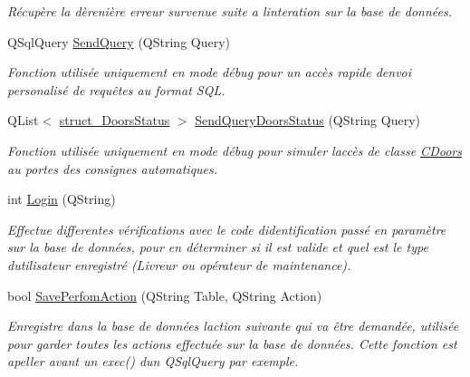 \begin{DoxyCompactItemize}
\begin{DoxyCompactList}\small\item\em Récupère la dèrenière erreur survenue suite a l\textquotesingle{}interation sur la base de données. \end{DoxyCompactList}\item 
Q\+Sql\+Query \hyperlink{class_c_s_q_lite___local___d_b_ace38eaa62cc5639b2a7be726d51a70f7}{Send\+Query} (Q\+String Query)
\begin{DoxyCompactList}\small\item\em Fonction utilisée uniquement en mode débug pour un accès rapide d\textquotesingle{}envoi personalisé de requêtes au format S\+Q\+L. \end{DoxyCompactList}\item 
Q\+List$<$ \hyperlink{structstruct___doors_status}{struct\+\_\+\+Doors\+Status} $>$ \hyperlink{class_c_s_q_lite___local___d_b_a0f79fbd185261af7806a3a99292ef0a3}{Send\+Query\+Doors\+Status} (Q\+String Query)
\begin{DoxyCompactList}\small\item\em Fonction utilisée uniquement en mode débug pour simuler l\textquotesingle{}accès de classe \hyperlink{class_c_doors}{C\+Doors} au portes des consignes automatiques. \end{DoxyCompactList}\item 
int \hyperlink{class_c_s_q_lite___local___d_b_a8114d5c22ae0a43e5466f3d69b3a9e84}{Login} (Q\+String)
\begin{DoxyCompactList}\small\item\em Effectue differentes vérifications avec le code d\textquotesingle{}identification passé en paramètre sur la base de données, pour en déterminer si il est valide et quel est le type d\textquotesingle{}utilisateur enregistré (Livreur ou opérateur de maintenance). \end{DoxyCompactList}\item 
bool \hyperlink{class_c_s_q_lite___local___d_b_a25433d7ada1d4173d92fdedfc9f1f253}{Save\+Perfom\+Action} (Q\+String Table, Q\+String Action)
\begin{DoxyCompactList}\small\item\em Enregistre dans la base de données l\textquotesingle{}action suivante qui va être demandée, utilisée pour garder toutes les actions effectuée sur la base de données. Cette fonction est apeller avant un exec() d\textquotesingle{}un Q\+Sql\+Query par exemple. \end{DoxyCompactList}\item 

\end{DoxyCompactItemize}
